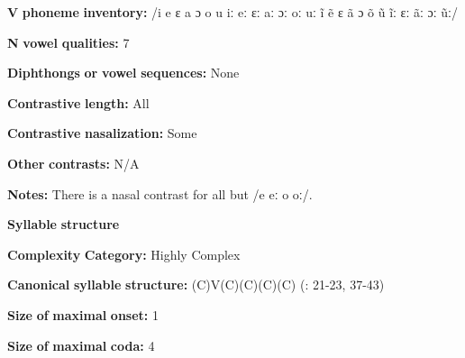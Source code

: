 \begin{styleBody}
\textbf{V} \textbf{phoneme} \textbf{inventory:} /i e ɛ a ɔ o u iː eː ɛː aː ɔː oː uː ĩ ẽ ɛ ã ɔ õ ũ ĩː ɛː ãː ɔː ũː/
\end{styleBody}

\begin{styleBody}
\textbf{N} \textbf{vowel} \textbf{qualities:} 7
\end{styleBody}

\begin{styleBody}
\textbf{Diphthongs} \textbf{or} \textbf{vowel} \textbf{sequences:} None
\end{styleBody}

\begin{styleBody}
\textbf{Contrastive} \textbf{length:} All
\end{styleBody}

\begin{styleBody}
\textbf{Contrastive} \textbf{nasalization:} Some
\end{styleBody}

\begin{styleBody}
\textbf{Other} \textbf{contrasts:} N/A
\end{styleBody}

\begin{styleBody}
\textbf{Notes:} There is a nasal contrast for all but /e eː o oː/.
\end{styleBody}

\begin{styleBody}
\textbf{Syllable} \textbf{structure}
\end{styleBody}

\begin{styleBody}
\textbf{Complexity} \textbf{Category:} Highly Complex
\end{styleBody}

\begin{styleBody}
\textbf{Canonical} \textbf{syllable} \textbf{structure:} (C)V(C)(C)(C)(C) (\citealt{WieringWiering1994}: 21-23, 37-43)
\end{styleBody}

\begin{styleBody}
\textbf{Size} \textbf{of} \textbf{maximal} \textbf{onset:} 1
\end{styleBody}

\begin{styleBody}
\textbf{Size} \textbf{of} \textbf{maximal} \textbf{coda:} 4
\end{styleBody}


